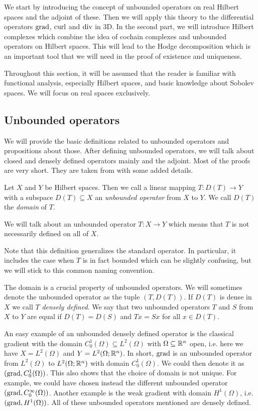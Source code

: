 \documentclass[../master_thesis.tex]{subfiles}
\begin{document}
We start by introducing the concept of unbounded operators on real Hilbert spaces and 
the adjoint of these. Then we will apply this theory to 
the differential operators $\operatorname{grad}$, $\operatorname{curl}$ and $\operatorname{div}$ in 3D. In the 
second part, we will introduce Hilbert complexes which combine the idea 
of cochain complexes and unbounded operators on Hilbert spaces. This will lead to the 
Hodge decomposition which is an important tool that we will need in the proof of 
existence and uniqueness.

Throughout this section, 
it will be assumed that the reader is familiar with functional analysis, 
especially Hilbert spaces, 
and basic knowledge about Sobolev spaces. We will focus on real spaces 
exclusively.

\subsection{Unbounded operators}\label{sec:unbounded_operators}

We will provide the basic definitions related to unbounded operators and propositions 
about those. After defining unbounded operators, we will talk about closed and 
densely defined operators mainly and the adjoint. 
Most of the proofs are very short. They are taken from \cite[Chap.\,3]{arnold}
with some added details. 

\begin{definition}
    Let $X$ and $Y$ be Hilbert spaces. Then we call a linear mapping 
    $T: D(T) \rightarrow Y$ with a subspace $D(T) \subseteq X$ an 
    \textit{unbounded 
    operator} from $X$ to $Y$. We call $D(T)$ the \textit{domain} of $T$.
\end{definition}
We will talk about an unbounded operator $T:X \rightarrow Y$ 
which means that $T$ is not necessarily defined on all of $X$. 

Note that this definition generalizes the standard operator. In particular, 
it includes the case when $T$ is in fact bounded which can be 
slightly confusing, but we will stick to this common naming convention. 

The domain is a crucial property of unbounded operators. We will sometimes 
denote the unbounded operator as the tuple $(T,D(T))$.
If $D(T)$ is dense in $X$ we call $T$ \textit{densely defined}. 
We say that two unbounded operators $T$ and $S$ from $X$ to $Y$ are equal 
if $D(T) = D(S)$ and $Tx = Sx$ for all $x\in D(T)$.

An easy
example of an unbounded densely defined operator is the classical gradient with 
the domain $C_0^1(\Omega) \subseteq L^2 (\Omega)$ 
with $\Omega \subseteq \mathbb{R}^n$ open, i.e. here we have $X=L^2(\Omega)$ and 
$Y=L^2(\Omega;\mathbb{R}^n)$.
In short, $\operatorname{grad}$ is an unbounded operator from $L^2(\Omega)$ to 
$L^2(\Omega;\mathbb{R}^n)$ with domain $C_0^1(\Omega)$.
We could then denote it as $(\operatorname{grad}, C_0^1(\Omega))$. This also shows that 
the choice of domain is not unique. For example, we could have chosen instead the 
different unbounded operator $(\operatorname{grad}, C_0^\infty (\Omega))$. 
Another example is the weak gradient with domain $H^1(\Omega)$, i.e.
$(\operatorname{grad}, H^1(\Omega))$. All of these unbounded operators mentioned are densely defined.
\end{document}

